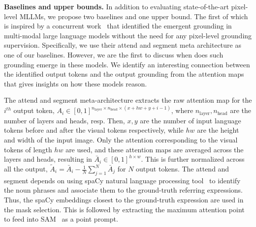 \textbf{Baselines and upper bounds.} In addition to evaluating state-of-the-art pixel-level MLLMs, we propose two baselines and one upper bound. The first of which is inspired by a concurrent work~\cite{cao2024emerging} that identified the emergent grounding in multi-modal large language models without the need for any pixel-level grounding supervision. Specifically, we use their attend and segment meta architecture as one of our baselines. However, we are the first to discuss when does such grounding emerge in these models. We identify an interesting connection between the identified output tokens and the output grounding from the attention maps that gives insights on how these models reason. 

The attend and segment meta-architecture extracts the raw attention map for the $i^{th}$ output token, $A_i \in [0, 1]^{n_{\text{layer}} \times n_{\text{head}} \times (x+hw+y+i-1)}$, where $n_{\text{layer}}, n_{\text{head}}$  are the number of layers and heads, resp. Then, $x,y$ are the number of input language tokens before and after the visual tokens respectively, while $hw$ are the height and width of the input image. Only the attention corresponding to the visual tokens of length $hw$ are used, and these attention maps are averaged across the layers and heads, resulting in $\bar{A}_i \in [0, 1]^{h \times w}$. This is further normalized across all the output, $\tilde{A}_i = \bar{A}_i - \frac{1}{N} \sum_{j=1}^{N}{\bar{A}_j}$ for $N$ output tokens. The attend and segment depends on using spaCy natural language processing tool~\cite{spaCy} to identify the noun phrases and associate them to the ground-truth referring expressions. Thus, the spaCy embeddings closest to the ground-truth expression are used in the mask selection. This is followed by extracting the maximum attention point to feed into SAM~\cite{kirillov2023segment} as a point prompt.

